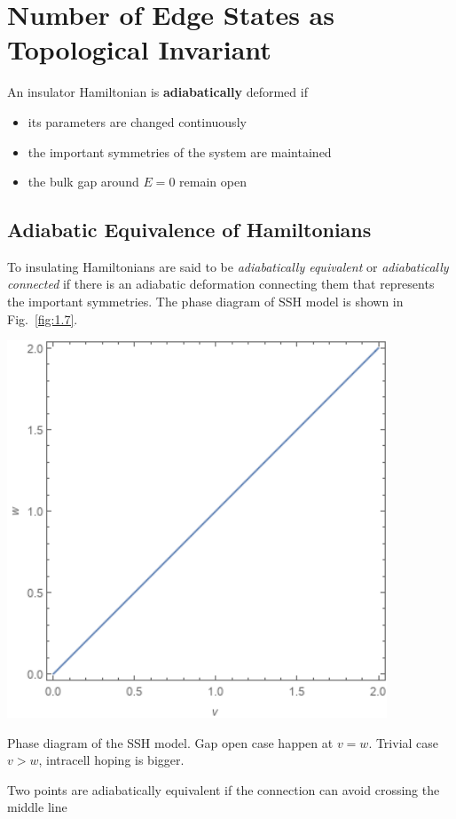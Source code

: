\section{Number of Edge States as Topological Invariant}\label{sec:1.5}
An insulator Hamiltonian is \textbf{adiabatically} deformed if
\begin{itemize}
    \item its parameters are changed continuously
    \item the important symmetries of the system are maintained
    \item the bulk gap around $E=0$ remain open
\end{itemize}

\subsection{Adiabatic Equivalence of Hamiltonians}\label{sec:1.5.1}
To insulating Hamiltonians are said to be \textit{adiabatically equivalent} or \textit{adiabatically connected} if there is an adiabatic deformation connecting them that represents the important symmetries.
The phase diagram of SSH model is shown in Fig.~\ref{fig:1.7}.
\begin{marginfigure}
    \center
    \includegraphics[width=0.85\textwidth]{fig/fig1-7.png}
    \caption{Phase diagram of the SSH model. Gap open case happen at $v=w$. Trivial case $v>w$, intracell hoping is bigger.}
    \label{fig:1.7}
\end{marginfigure}
Two points are adiabatically equivalent if the connection can avoid crossing the middle line

